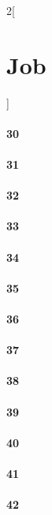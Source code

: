 \documentclass{book}
\begin{document}
\begin{multicols}{2}[\part{Job}]
\subsection*{30}
\subsection*{31}
\subsection*{32}
\subsection*{33}
\subsection*{34}
\subsection*{35}
\subsection*{36}
\subsection*{37}
\subsection*{38}
\subsection*{39}
\subsection*{40}
\subsection*{41}
\subsection*{42}
\end{multicols}
\end{document}
